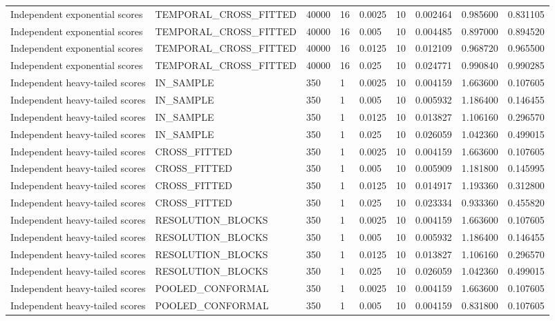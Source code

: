 \begin{tabular}{lllllllll}
Independent exponential scores & TEMPORAL\_CROSS\_FITTED & 40000 & 16 & 0.0025 & 10 & 0.002464 & 0.985600 & 0.831105 \\
Independent exponential scores & TEMPORAL\_CROSS\_FITTED & 40000 & 16 & 0.005 & 10 & 0.004485 & 0.897000 & 0.894520 \\
Independent exponential scores & TEMPORAL\_CROSS\_FITTED & 40000 & 16 & 0.0125 & 10 & 0.012109 & 0.968720 & 0.965500 \\
Independent exponential scores & TEMPORAL\_CROSS\_FITTED & 40000 & 16 & 0.025 & 10 & 0.024771 & 0.990840 & 0.990285 \\
Independent heavy-tailed scores & IN\_SAMPLE & 350 & 1 & 0.0025 & 10 & 0.004159 & 1.663600 & 0.107605 \\
Independent heavy-tailed scores & IN\_SAMPLE & 350 & 1 & 0.005 & 10 & 0.005932 & 1.186400 & 0.146455 \\
Independent heavy-tailed scores & IN\_SAMPLE & 350 & 1 & 0.0125 & 10 & 0.013827 & 1.106160 & 0.296570 \\
Independent heavy-tailed scores & IN\_SAMPLE & 350 & 1 & 0.025 & 10 & 0.026059 & 1.042360 & 0.499015 \\
Independent heavy-tailed scores & CROSS\_FITTED & 350 & 1 & 0.0025 & 10 & 0.004159 & 1.663600 & 0.107605 \\
Independent heavy-tailed scores & CROSS\_FITTED & 350 & 1 & 0.005 & 10 & 0.005909 & 1.181800 & 0.145995 \\
Independent heavy-tailed scores & CROSS\_FITTED & 350 & 1 & 0.0125 & 10 & 0.014917 & 1.193360 & 0.312800 \\
Independent heavy-tailed scores & CROSS\_FITTED & 350 & 1 & 0.025 & 10 & 0.023334 & 0.933360 & 0.455820 \\
Independent heavy-tailed scores & RESOLUTION\_BLOCKS & 350 & 1 & 0.0025 & 10 & 0.004159 & 1.663600 & 0.107605 \\
Independent heavy-tailed scores & RESOLUTION\_BLOCKS & 350 & 1 & 0.005 & 10 & 0.005932 & 1.186400 & 0.146455 \\
Independent heavy-tailed scores & RESOLUTION\_BLOCKS & 350 & 1 & 0.0125 & 10 & 0.013827 & 1.106160 & 0.296570 \\
Independent heavy-tailed scores & RESOLUTION\_BLOCKS & 350 & 1 & 0.025 & 10 & 0.026059 & 1.042360 & 0.499015 \\
Independent heavy-tailed scores & POOLED\_CONFORMAL & 350 & 1 & 0.0025 & 10 & 0.004159 & 1.663600 & 0.107605 \\
Independent heavy-tailed scores & POOLED\_CONFORMAL & 350 & 1 & 0.005 & 10 & 0.004159 & 0.831800 & 0.107605 \\

\end{tabular}
